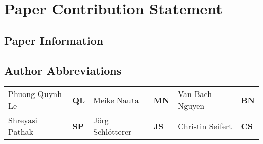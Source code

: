 \documentclass{article}
\begin{document}
\rhead{\textcolor{gray}{[Document Version 0.1]}}



\section*{Paper Contribution Statement}

\subsection*{Paper Information}

\subsection*{Author Abbreviations}
\begin{tabular}{llllll}
Phuong Quynh Le     & \textbf{QL} &
Meike Nauta         & \textbf{MN}  &
Van Bach Nguyen     & \textbf{BN} \\
Shreyasi Pathak     & \textbf{SP}  &
Jörg Schlötterer    & \textbf{JS}  &
Christin Seifert    & \textbf{CS}
\\
\end{tabular}
\end{document}
